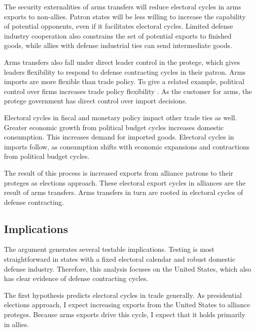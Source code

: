 \documentclass[12pt]{article}
\begin{document}
The security externalities of arms transfers will reduce electoral cycles in arms exports to non-allies. 
Patron states will be less willing to increase the capability of potential opponents, even if it facilitates electoral cycles.
Limited defense industry cooperation also constrains the set of potential exports to finished goods, while allies with defense industrial ties can send intermediate goods.


Arms transfers also fall under direct leader control in the protege, which gives leaders flexibility to respond to defense contracting cycles in their patron.
Arms imports are more flexible than trade policy. 
To give a related example, political control over firms increases trade policy flexibility \citep{Davisetal2019}.
As the customer for arms, the protege government has direct control over import decisions.


Electoral cycles in fiscal and monetary policy impact other trade ties as well. 
Greater economic growth from political budget cycles increases domestic consumption.
This increases demand for imported goods. 
Electoral cycles in imports follow, as consumption shifts with economic expansions and contractions from political budget cycles.  




The result of this process is increased exports from alliance patrons to their proteges as elections approach.
These electoral export cycles in alliances are the result of arms transfers. 
Arms transfers in turn are rooted in electoral cycles of defense contracting.





\subsection{Implications}



The argument generates several testable implications. 
Testing is most straightforward in states with a fixed electoral calendar and robust domestic defense industry. 
Therefore, this analysis focuses on the United States, which also has clear evidence of defense contracting cycles.


The first hypothesis predicts electoral cycles in trade generally. 
As presidential elections approach, I expect increasing exports from the United States to alliance proteges.
Because arms exports drive this cycle, I expect that it holds primarily in allies.
\end{document}
